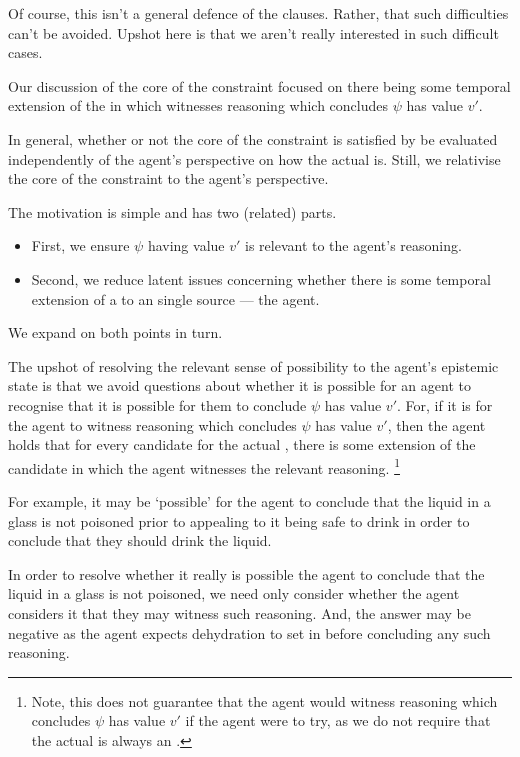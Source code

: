 \begin{note}
  Of course, this isn't a general defence of the clauses.
  Rather, that such difficulties can't be avoided.
  Upshot here is that we aren't really interested in such difficult cases.
\end{note}


\begin{note}
  Our discussion of the core of the constraint focused on there being some temporal extension of the \world{} in which \vAgent{} witnesses reasoning which concludes \(\psi\) has value \(v'\).

  In general, whether or not the core of the constraint is satisfied by be evaluated independently of the agent's perspective on how the actual \world{} is.
  Still, we relativise the core of the constraint to the agent's perspective.

  The motivation is simple and has two (related) parts.
  \begin{itemize}
  \item
    First, we ensure \(\psi\) having value \(v'\) is relevant to the agent's reasoning.
  \item
    Second, we reduce latent issues concerning whether there is some temporal extension of a \world{} to an single source --- the agent.
  \end{itemize}
  We expand on both points in turn.
\end{note}


\begin{note}
  The upshot of resolving the relevant sense of possibility to the agent's epistemic state is that we avoid questions about whether it is possible for an agent to recognise that it is possible for them to conclude \(\psi\) has value \(v'\).
  For, if it is \epVAd{} for the agent to witness reasoning which concludes \(\psi\) has value \(v'\), then the agent holds that for every candidate for the actual \world{}, there is some extension of the candidate \world{} in which the agent witnesses the relevant reasoning.\nolinebreak
  \footnote{
    Note, this does not guarantee that the agent would witness reasoning which concludes \(\psi\) has value \(v'\) if the agent were to try, as we do not require that the actual \world{} is always an \epVW{}.
  }

  For example, it may be `possible' for the agent to conclude that the liquid in a glass is not poisoned prior to appealing to it being safe to drink in order to conclude that they should drink the liquid.

  In order to resolve whether it really is possible the agent to conclude that the liquid in a glass is not poisoned, we need only consider whether the agent considers it \epVAd{} that they may witness such reasoning.
  And, the answer may be negative as the agent expects dehydration to set in before concluding any such reasoning.
\end{note}

